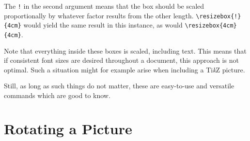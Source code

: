 \documentclass[a4paper,11pt]{article}
\newcommand\code[1]{\texttt{#1}}
\begin{document}
The  \code{!}   in  the  second  argument   means  that  the  box   should  be
scaled  proportionally  by whatever  factor  results  from the  other  length.
\code{\textbackslash{}resizebox\{!\}\{4cm\}}  would yield  the same  result in
this instance, as would \code{\textbackslash{}resizebox\{4cm\}\{4cm\}}.

\vspace{1em}


\vspace{1em}

Note that everything inside these  boxes is scaled, including text. This means
that  if  consistent font  sizes  are  desired  throughout a   document,  this
approach  is  not optimal. Such  a  situation  might  for example  arise  when
including a Ti\emph{k}Z picture.

Still,  as long  as  such things  do  not matter,  these  are easy-to-use  and
versatile commands which are good to know.


\newpage
\section{Rotating a Picture}
\end{document}
